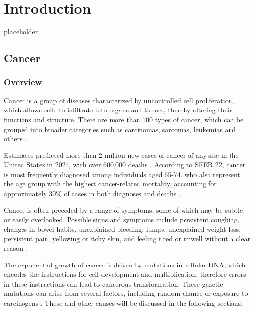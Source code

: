 \chapter{Introduction} \label{chap:introduction}

placeholder. 

\section{Cancer}

\subsection{Overview} 

Cancer is a group of diseases characterized by uncontrolled cell proliferation, which allows cells to infiltrate into organs and tissues, thereby altering their functions and structure. There are more than 100 types of cancer, which can be grouped into broader categories such as \href{https://en.wikipedia.org/wiki/Carcinoma}{carcinomas}, \href{https://en.wikipedia.org/wiki/Sarcoma}{sarcomas}, \href{https://en.wikipedia.org/wiki/Leukemia}{leukemias} and others \cite{cancer1}.

Estimates predicted more than 2 million new cases of cancer of any site in the United States in 2024, with over 600,000 deaths \cite{cancer4}. According to SEER \cite{seer} 22, cancer is most frequently diagnosed among individuals aged 65-74, who also represent the age group with the highest cancer-related mortality, accounting for approximately 30\% of cases in both diagnoses and deaths \cite{cancer5}.

Cancer is often preceded by a range of symptoms, some of which may be subtle or easily overlooked. Possible signs and symptoms include persistent coughing, changes in bowel habits, unexplained bleeding, lumps, unexplained weight loss, persistent pain, yellowing or itchy skin, and feeling tired or unwell without a clear reason \cite{cancer3}.

The exponential growth of cancer is driven by mutations in cellular DNA, which encodes the instructions for cell development and multiplication, therefore errors in these instructions can lead to cancerous transformation. These genetic mutations can arise from several factors, including random chance or exposure to carcinogens \cite{cancer2}. These and other causes will be discussed in the following sections.

